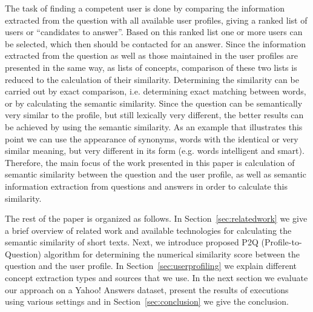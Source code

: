 \documentclass[conference]{IEEEtran}
\newcommand{\secref}[1]{Section~\ref{#1}}
\begin{document}
The task of finding a competent user is done by comparing the information extracted from the question with all available user profiles, giving a ranked list of users or ``candidates to answer''. Based on this ranked list one or more users can be selected, which then should be contacted for an answer. Since the information extracted from the question as well as those maintained in the user profiles are presented in the same way, as lists of concepts, comparison of these two lists is reduced to the calculation of their similarity. Determining the similarity can be carried out by exact comparison, i.e. determining exact matching between words, or by calculating the semantic similarity. Since the question can be semantically very similar to the profile, but still lexically very different, the better results can be achieved by using the semantic similarity. As an example that illustrates this point we can use the appearance of synonyms, words with the identical or very similar meaning, but very different in its form (e.g. words intelligent and smart). Therefore, the main focus of the work presented in this paper is calculation of semantic similarity between the question and the user profile, as well as semantic information extraction from questions and answers in order to calculate this similarity.

The rest of the paper is organized as follows. In \secref{sec:relatedwork} we give a brief overview of related work and available technologies for calculating the semantic similarity of short texts. Next, we introduce proposed P2Q (Profile-to-Question) algorithm for determining the numerical similarity score between the question and the user profile. In \secref{sec:userprofiling} we explain different concept extraction types and sources that we use. In the next section we evaluate our approach on a Yahoo! Answers dataset, present the results of executions using various settings and in \secref{sec:conclusion} we give the conclusion. 




%
%
\end{document}
